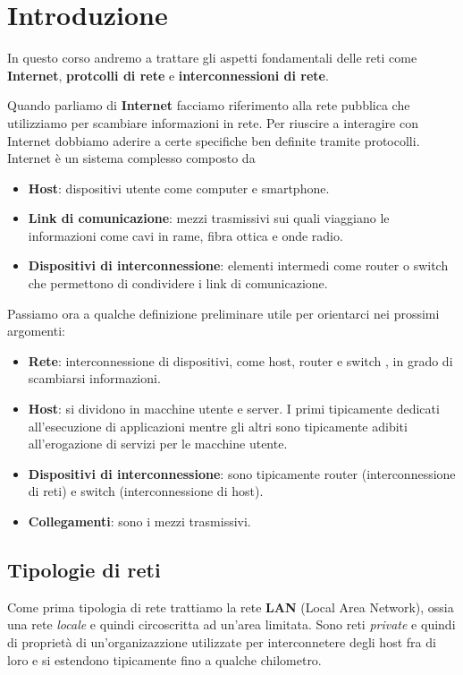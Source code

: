 \chapter{Introduzione}
In questo corso andremo a trattare gli aspetti fondamentali delle reti come \textbf{Internet}, 
\textbf{protcolli di rete} e \textbf{interconnessioni di rete}.

Quando parliamo di \textbf{Internet} facciamo riferimento alla rete pubblica che utilizziamo per 
scambiare informazioni in rete. Per riuscire a interagire con Internet dobbiamo aderire a certe
specifiche ben definite tramite protocolli. Internet è un sistema complesso composto da
\begin{itemize}
	\item \textbf{Host}: dispositivi utente come computer e smartphone.
	\item \textbf{Link di comunicazione}: mezzi trasmissivi sui quali viaggiano le informazioni
		come cavi in rame, fibra ottica e onde radio.
	\item \textbf{Dispositivi di interconnessione}: elementi intermedi come router o switch che 
		permettono di condividere i link di comunicazione.
\end{itemize}
Passiamo ora a qualche definizione preliminare utile per orientarci nei prossimi argomenti:
\begin{itemize}
	\item \textbf{Rete}: interconnessione di dispositivi, come host, router e switch , in grado di
		scambiarsi informazioni.
	\item \textbf{Host}: si dividono in macchine utente e server. I primi tipicamente dedicati
		all'esecuzione di applicazioni mentre gli altri sono tipicamente adibiti all'erogazione 
		di servizi per le macchine utente.
	\item \textbf{Dispositivi di interconnessione}: sono tipicamente router (interconnessione di 
		reti) e switch (interconnessione di host).
	\item \textbf{Collegamenti}: sono i mezzi trasmissivi.
\end{itemize}

\section{Tipologie di reti}
Come prima tipologia di rete trattiamo la rete \textbf{LAN} (Local Area Network), ossia una rete
\emph{locale} e quindi circoscritta ad un'area limitata. Sono reti \emph{private} e quindi di
proprietà di un'organizazzione utilizzate per interconnetere degli host fra di loro e si estendono
tipicamente fino a qualche chilometro.

